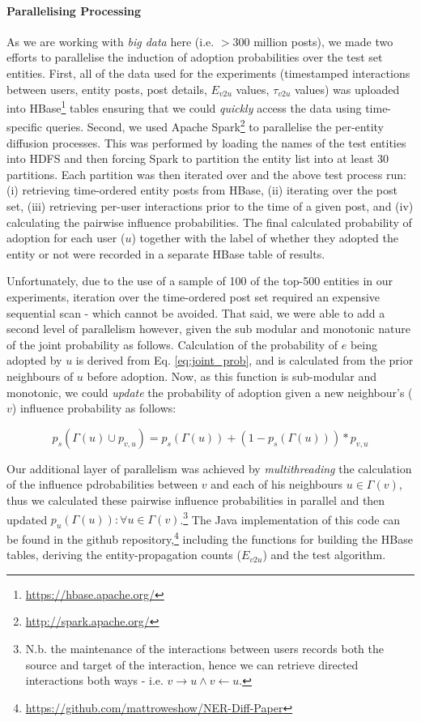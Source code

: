 \documentclass[10pt,journal,compsoc]{IEEEtran}
\begin{document}
\paragraph{Parallelising Processing}
As we are working with \emph{big data} here (i.e. $>300$ million posts), we made two efforts to parallelise the induction of adoption probabilities over the test set entities.
First, all of the data used for the experiments (timestamped interactions between users, entity posts, post details, $E_{v2u}$ values, $\tau_{v2u}$ values) was uploaded into HBase\footnote{\url{https://hbase.apache.org/}} tables ensuring that we could \emph{quickly} access the data using time-specific queries.
Second, we used Apache Spark\footnote{\url{http://spark.apache.org/}} to parallelise the per-entity diffusion processes.
This was performed by loading the names of the test entities into HDFS and then forcing Spark to partition the entity list into at least 30 partitions.
Each partition was then iterated over and the above test process run: (i) retrieving time-ordered entity posts from HBase, (ii) iterating over the post set, (iii) retrieving per-user interactions prior to the time of a given post, and (iv) calculating the pairwise influence probabilities.
The final calculated probability of adoption for each user ($u$) together with the label of whether they adopted the entity or not were recorded in a separate HBase table of results.

Unfortunately, due to the use of a sample of 100 of the top-500 entities in our experiments, iteration over the time-ordered post set required an expensive sequential scan - which cannot be avoided.
That said, we were able to add a second level of parallelism however, given the sub modular and monotonic nature of the joint probability as follows.
Calculation of the probability of $e$ being adopted by $u$ is derived from Eq. \ref{eq:joint_prob}, and is calculated from the prior neighbours of $u$ before adoption.
Now, as this function is sub-modular and monotonic, we could \emph{update} the probability of adoption given a new neighbour's ($v$) influence probability as follows:

\begin{equation}
p_s(\Gamma(u) \cup p_{v,u}) = p_s(\Gamma(u)) + (1 - p_s(\Gamma(u))) * p_{v,u}
\end{equation}

Our additional layer of parallelism was achieved by \emph{multithreading} the calculation of the influence pdrobabilities between $v$ and each of his neighbours $u \in \Gamma(v)$, thus we calculated these pairwise influence probabilities in parallel and then updated $p_u(\Gamma(u)) : \forall u \in \Gamma(v)$.\footnote{N.b. the maintenance of the interactions between users records both the source and target of the interaction, hence we can retrieve directed interactions both ways - i.e. $v \rightarrow u \wedge v \leftarrow u$.}
The Java implementation of this code can be found in the github repository,\footnote{\url{https://github.com/mattroweshow/NER-Diff-Paper}} including the functions for building the HBase tables, deriving the entity-propagation counts ($E_{v2u}$) and the test algorithm.
\end{document}
